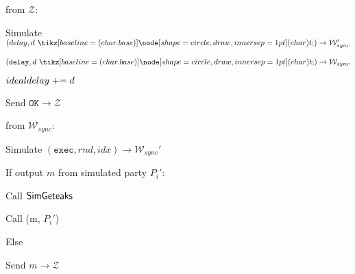 \begin{bbox}[title={Simulator $\mathcal{S}_{bracha} (\mathcal{D}, \mathcal{P}, \Delta)$}]
\OnInput {} from $\mathcal{Z}$:
	\begin{renumerate}
	\item Simulate $(delay, d \token) \rightarrow \mathcal{W}_{sync}'$

	\item \Send $(\texttt{delay}, d \token) \rightarrow \mathcal{W}_{sync}$

	\item $idealdelay \mathrel{+}= d$

	\item Send $\texttt{OK} \rightarrow \mathcal{Z}$
	\end{renumerate}

\OnInput {} from $\mathcal{W}_{sync}$:
	\begin{renumerate}
	\item Simulate $(\texttt{exec}, rnd, idx) \rightarrow \mathcal{W}_{sync}'$


	\item If output $m$ from simulated party $P_i'$:

		\quad Call ${\mathsf {SimGeteaks}}$

		\quad Call (m, $P_i'$)

	\item Else

		\quad Send $m \rightarrow \mathcal{Z}$

%
%
%  
%
%
%
	\end{renumerate}

\end{bbox}
